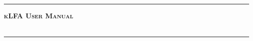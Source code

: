 \thispagestyle{empty}
\begin{titlepage}



  \hspace{6.2cm}

    \vspace{1.5cm}

  \begin{center}
    \hrule height 2pt
    \vspace{0.3cm}
      \scshape \huge \textbf{kLFA User Manual}\\
            {\normalsize \textbf{}}\\
    \vspace{0.3cm}
    \hrule height 2pt
    \end{center}

\vspace{3.7cm}




\end{titlepage}


\thispagestyle{empty} \vspace{0.1cm} \hspace{0.2cm}
\clearpage{\pagestyle{empty}\cleardoublepage}